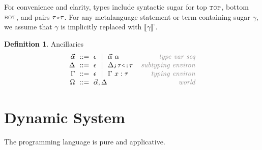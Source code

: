 \documentclass[acmsmall]{acmart}
\theoremstyle{definition}
\newtheorem{definition}{Definition}[section]
\begin{document}
For convenience and clarity, types include syntactic sugar for top $\J{TOP}$, 
bottom $\J{BOT}$, and pairs $\tau \J{*} \tau$.
For any metalanguage statement or term containing sugar $\gamma$, we assume that $\gamma$ is implicitly replaced with $\llbracket \gamma \rrbracket^\square$.



\begin{definition} Ancillaries 
  \label{def:type_ancillaries}
  \[\begin{array}[t]{r@{}l@{}r}
    \nonterm{\vec{\alpha}} & \is \epsilon \sep \vec{\alpha}\ \alpha 
    & \com{type var seq}
    \\
    \nonterm{\Delta} & \is \epsilon \sep \Delta \J{;} \tau \J{<:} \tau
    & \com{subtyping environ}
    \\
    \nonterm{\Gamma} & \is \epsilon \sep \Gamma\ x \hastype \tau
    & \com{typing environ}
    \\
    \nonterm{\Omega} & \is \vec{\alpha},\Delta 
    & \com{world}
  \end{array}\]
\end{definition}


\section{Dynamic System}
\label{sec:dynamic_system}

The programming language is pure and applicative. 
\end{document}
